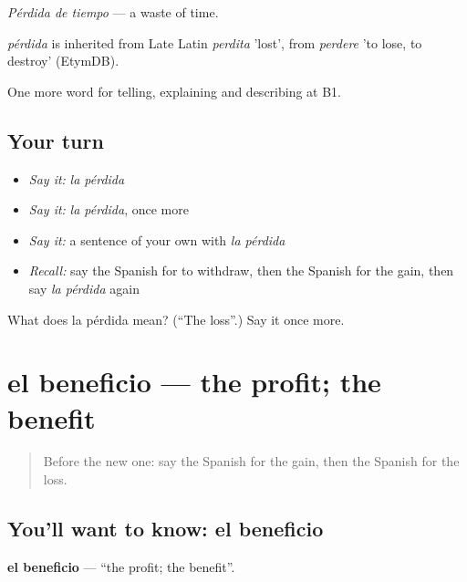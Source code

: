 \emph{Pérdida de tiempo} — a waste of time.

\begin{cousinweb}
\emph{pérdida} is inherited from Late Latin \emph{perdita} 'lost', from \emph{perdere} 'to lose, to destroy' (EtymDB).
\end{cousinweb}

\begin{grammarlens}[title={What you've built}]
One more word for telling, explaining and describing at B1.
\end{grammarlens}

\subsection*{Your turn}
\begin{itemize}
\raggedright
  \item \emph{Say it:} \emph{la pérdida}
  \item \emph{Say it:} \emph{la pérdida}, once more
  \item \emph{Say it:} a sentence of your own with \emph{la pérdida}
  \item \emph{Recall:} say the Spanish for to withdraw, then the Spanish for the gain, then say \emph{la pérdida} again
\end{itemize}

\begin{tcolorbox}[breakable,colback=teal!4,colframe=teal!35!black,title={Before you move on}]
What does la pérdida mean? (\textquotedblleft{}The loss\textquotedblright{}.) Say it once more.
\end{tcolorbox}
\section[el beneficio]{el beneficio — the profit; the benefit}

\label{lesson:ES-C629-beneficio}



\begin{quote}
Before the new one: say the Spanish for the gain, then the Spanish for the loss.
\end{quote}

\subsection*{You'll want to know: el beneficio}
\textbf{el beneficio} — \textquotedblleft{}the profit; the benefit\textquotedblright{}.

